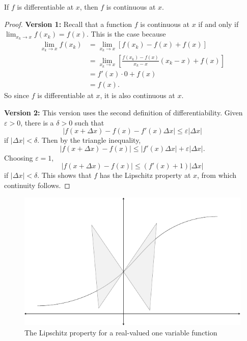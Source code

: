 \documentclass[10pt]{report}
\begin{document}
\begin{prop}
	If $f$ is differentiable at $x$, then $f$ is continuous at $x$.
\end{prop}
\begin{proof}
	\textbf{Version 1:} 
	Recall that a function $f$ is continuous at $x$ if and only if $\lim_{x_k \to x} f(x_k) = f(x)$. This is the case because
	\begin{align*}
		\lim_{x_k \to x} f(x_k) &= \lim_{x_k \to x} \left[ f(x_k) - f(x) + f(x) \right] \\
					&= \lim_{x_k \to x} \left[ \frac{f(x_k) - f(x)}{x_k - x} (x_k - x) + f(x) \right] \\
					&= f'(x) \cdot 0 + f(x) \\
					&= f(x).
	\end{align*}
	So since $f$ is differentiable at $x$, it is also continuous at $x$.

	\textbf{Version 2:}
	This version uses the second definition of differentiability. Given $\varepsilon>0$, there is a $\delta>0$ such that
	\[
		|f(x+\Delta x) - f(x) - f'(x) \Delta x| \leq \varepsilon|\Delta x|
	\] 
	if $|\Delta x| < \delta$. Then by the triangle inequality,
	\[
		|f(x+\Delta x) - f(x)| \leq |f'(x) \Delta x| + \varepsilon|\Delta x|.
	\] 
	Choosing $\varepsilon=1$,
	\[
		|f(x+\Delta x)-f(x)| \leq (f'(x)+1)|\Delta x|
	\] 
	if $|\Delta x| < \delta$. This shows that $f$ has the Lipschitz property at $x$, from which continuity follows.
\end{proof}

\begin{figure}[H]
	\centering
	\includegraphics[scale=1]{fig/lipschitz.pdf}
	\caption{The Lipschitz property for a real-valued one variable function}
\end{figure}
\end{document}
